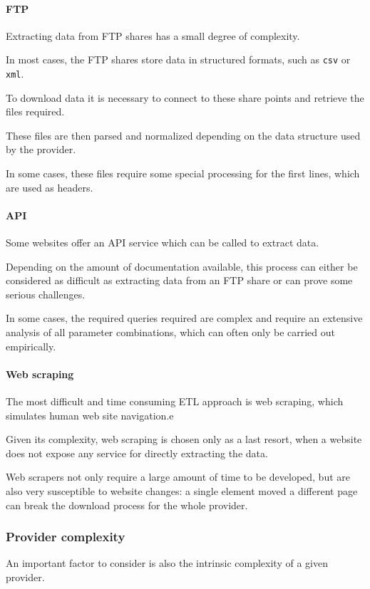     \paragraph{FTP}
        Extracting data from FTP shares has a small degree of complexity.
        
        In most cases, the FTP shares store data in structured formats, such as \texttt{csv} or \texttt{xml}.
        
        To download data it is necessary to connect to these share points and retrieve the files required.
        
        These files are then parsed and normalized depending on the data structure used by the provider.
        
        In some cases, these files require some special processing for the first lines, which are used as headers.
        
    \paragraph{API}
        Some websites offer an API service which can be called to extract data.
        
        Depending on the amount of documentation available, this process can either be considered as difficult as extracting data from an FTP share or can prove some serious challenges.
        
        In some cases, the required queries required are complex and require an extensive analysis of all parameter combinations, which can often only be carried out empirically.
        
    \paragraph{Web scraping}
        The most difficult and time consuming ETL approach is web scraping, which simulates human web site navigation.e
        
        Given its complexity, web scraping is chosen only as a last resort, when a website does not expose any service for directly extracting the data.
        
        Web scrapers not only require a large amount of time to be developed, but are also very susceptible to website changes: a single element moved a different page can break the download process for the whole provider.
        
\subsubsection{Provider complexity}
    An important factor to consider is also the intrinsic complexity of a given provider.
    
